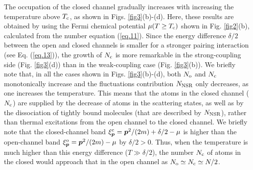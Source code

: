 \documentclass[a4paper]{jpconf}
\begin{document}
\par
The occupation of the closed channel gradually increases with increasing the temperature above $T_{\rm c}$, as shown in Figs. \ref{fig3}(b)-(d). Here, these results are obtained by using the Fermi chemical potential $\mu(T\ge T_{\rm c})$ shown in Fig. \ref{fig2}(b), calculated from the number equation (\ref{eq.11}). Since the energy difference $\delta/2$ between the open and closed channels is smaller for a stronger pairing interaction (see Eq. (\ref{eq.13})), the growth of $N_{\rm c}$ is more remarkable in the strong-coupling side (Fig. \ref{fig3}(d)) than in the weak-coupling case (Fig. \ref{fig3}(b)). We briefly note that, in all the cases shown in Figs. \ref{fig3}(b)-(d), both $N_{\rm o}$ and $N_{\rm c}$ monotonically increase and the fluctuations contribution $N_{\rm NSR}$ only decreases, as one increases the temperature. This means that the atoms in the closed channel ($N_{\rm c}$) are supplied by the decrease of atoms in the scattering states, as well as by the dissociation of tightly bound molecules (that are described by $N_{\rm NSR}$), rather than thermal excitations from the open channel to the closed channel. We briefly note that the closed-channel band $\xi_{\bm p}^{\rm c}={\bm p}^2/(2m)+\delta/2-\mu$ is higher than the open-channel band $\xi_{\bm p}^{\rm o}={\bm p}^2/(2m)-\mu$ by $\delta/2>0$. Thus, when the temperature is much higher than this energy difference ($T\gg \delta/2$), the number $N_{\rm c}$ of atoms in the closed would approach that in the open channel as $N_{\rm o}\simeq N_{\rm c}\simeq N/2$.
\par
\par
\end{document}
